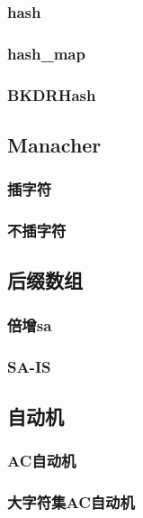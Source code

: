﻿\documentclass[a4paper,twocolumn]{article}
\begin{document}
\subsubsection{hash}

\subsubsection{hash\_map}

\subsubsection{BKDRHash}

\subsection{Manacher}
\subsubsection{插字符}

\subsubsection{不插字符}

\subsection{后缀数组}
\subsubsection{倍增sa}

\subsubsection{SA-IS}

\subsection{自动机}
\subsubsection{AC自动机}

\subsubsection{大字符集AC自动机}

\end{document}
